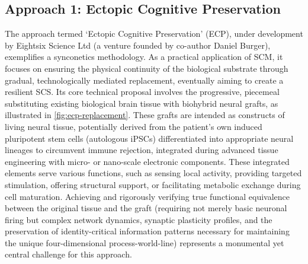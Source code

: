 \documentclass[10pt]{article}
\begin{document}
\begin{sloppypar}
  \subsection{Approach 1: Ectopic Cognitive Preservation}
  \label{sec:daniel-approach}

  The approach termed ‘Ectopic Cognitive Preservation’ (ECP), under development by Eightsix Science Ltd (a venture founded by co-author Daniel Burger), exemplifies a synconetics methodology. As a practical application of SCM, it focuses on ensuring the physical continuity of the biological substrate through gradual, technologically mediated replacement, eventually aiming to create a resilient SCS. Its core technical proposal involves the progressive, piecemeal substituting existing biological brain tissue with biohybrid neural grafts, as illustrated in \autoref{fig:ecp-replacement}. These grafts are intended as constructs of living neural tissue, potentially derived from the patient’s own induced pluripotent stem cells (autologous iPSCs) differentiated into appropriate neural lineages to circumvent immune rejection, integrated during advanced tissue engineering with micro- or nano-scale electronic components. These integrated elements serve various functions, such as sensing local activity, providing targeted stimulation, offering structural support, or facilitating metabolic exchange during cell maturation. Achieving and rigorously verifying true functional equivalence between the original tissue and the graft (requiring not merely basic neuronal firing but complex network dynamics, synaptic plasticity profiles, and the preservation of identity-critical information patterns necessary for maintaining the unique four-dimensional process-world-line) represents a monumental yet central challenge for this approach.


\end{sloppypar}
\end{document}
